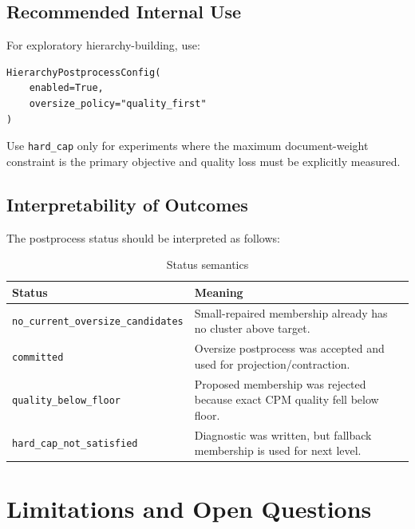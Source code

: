 \documentclass[11pt,a4paper]{article}
\begin{document}
\subsection{Recommended Internal Use}

For exploratory hierarchy-building, use:

\begin{verbatim}
HierarchyPostprocessConfig(
    enabled=True,
    oversize_policy="quality_first"
)
\end{verbatim}

Use \texttt{hard\_cap} only for experiments where the maximum document-weight
constraint is the primary objective and quality loss must be explicitly
measured.

\subsection{Interpretability of Outcomes}

The postprocess status should be interpreted as follows:

\begin{table}[h]
\centering
\caption{Status semantics}
\begin{tabularx}{\textwidth}{p{}X}
\toprule
Status & Meaning \\
\midrule
{\small\texttt{no\_current\_oversize\_candidates}}
    & Small-repaired membership already has no cluster above target. \\
\texttt{committed}
    & Oversize postprocess was accepted and used for projection/contraction. \\
\texttt{quality\_below\_floor}
    & Proposed membership was rejected because exact CPM quality fell below floor. \\
\texttt{hard\_cap\_not\_satisfied}
    & Diagnostic was written, but fallback membership is used for next level. \\
\bottomrule
\end{tabularx}
\end{table}

\section{Limitations and Open Questions}
\end{document}
